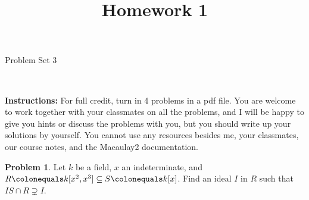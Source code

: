 \documentclass[11pt]{article}
\title{}
\date{\vspace{-0.5in}}
\title{Homework 1}
\theoremstyle{definition}
\newtheorem{problem}{Problem}
\begin{document}
\thispagestyle{fancy}
\pagestyle{fancy}

\vspace{3em}

\begin{center}
	{\LARGE Problem Set 3}
\end{center}

\

\noindent
{\bf Instructions:}
For full credit, turn in 4 problems in a pdf file. 
You are welcome to work together with your classmates on all the problems, and I will be happy to give you hints or discuss the problems with you, but you should write up your solutions by yourself.
You cannot use any resources besides me, your classmates, our course notes, and the Macaulay2 documentation.


\vspace{0.6em}
%



\begin{problem}
	Let $k$ be a field, $x$ an indeterminate, and $R \colonequals k[x^2, x^3] \subseteq S \colonequals k[x]$. Find an ideal $I$ in $R$ such that $IS \cap R \supsetneq I$.
\end{problem}
\end{document}
